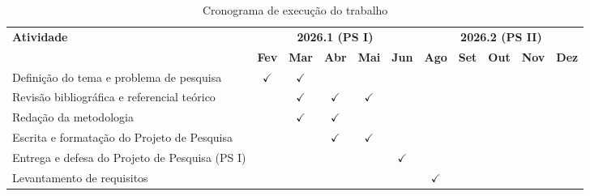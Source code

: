 \begin{table}[htb]
\caption{Cronograma de execução do trabalho}
\label{qua:cronograma}


\renewcommand{\arraystretch}{1.4}
\begin{tabularx}{\textwidth}{|X|c|c|c|c|c|c|c|c|c|c|}
  \hline
  \multirow{2}{*}{\textbf{Atividade}} &
  \multicolumn{5}{c|}{\textbf{2026.1 (PS I)}} &
  \multicolumn{5}{c|}{\textbf{2026.2 (PS II)}} \\
  \cline{2-11}
  & \textbf{Fev} & \textbf{Mar} & \textbf{Abr} & \textbf{Mai} & \textbf{Jun}
  & \textbf{Ago} & \textbf{Set} & \textbf{Out} & \textbf{Nov} & \textbf{Dez} \\
  \hline


  Definição do tema e problema de pesquisa
  & $\checkmark$ & $\checkmark$ & & & & & & & & \\
  \hline

  Revisão bibliográfica e referencial teórico
  & & $\checkmark$ & $\checkmark$ & $\checkmark$ & & & & & & \\
  \hline

  Redação da metodologia
  & & $\checkmark$ & $\checkmark$ & & & & & & & \\
  \hline

  Escrita e formatação do Projeto de Pesquisa
  & & & $\checkmark$ & $\checkmark$ & & & & & & \\
  \hline

  Entrega e defesa do Projeto de Pesquisa (PS I)
  & & & & & $\checkmark$ & & & & & \\
  \hline


  Levantamento de requisitos
  & & & & & & $\checkmark$ & & & & \\
  \hline


\end{tabularx}
\end{table}
